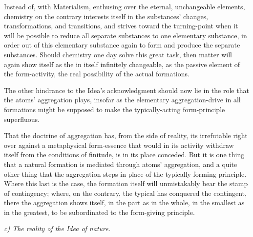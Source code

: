 \documentclass[12pt]{book}
\begin{document}
Instead of, with Materialism, enthusing over the eternal, unchangeable elements, chemistry on the contrary
interests itself in the substances' changes,
transformations, and transitions, and strives toward the turning-point when it will be possible to
reduce all separate substances to one elementary substance, in order out of this elementary substance again
to form and produce the separate substances. Should chemistry one day solve this great task, then matter
will again show itself as the in itself infinitely changeable, as the passive element of the form-activity,
the real possibility of the actual formations.

The other hindrance to the Idea's acknowledgment should now lie in the role that the atoms' aggregation
plays, insofar as the elementary aggregation-drive in all formations might be supposed to make the
typically-acting form-principle superfluous.

That the doctrine of aggregation has, from the side of reality, its irrefutable right over against a
metaphysical form-essence that would in its activity
withdraw itself from the conditions of finitude, is in its place conceded. But it is one thing that a
natural formation is mediated through atoms' aggregation, and a quite other thing that the aggregation
steps in place of the typically forming principle. Where this last is the case, the formation itself will
unmistakably bear the stamp of contingency; where, on the contrary, the typical has conquered the
contingent, there the aggregation shows itself, in the part as in the whole, in the smallest as in the
greatest, to be subordinated to the form-giving principle.

\begin{center}\emph{c) The reality of the Idea of nature.}\end{center}
\end{document}

